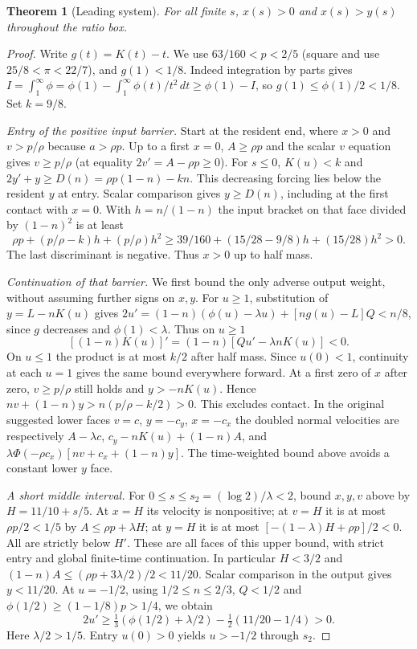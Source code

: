 \documentclass[11pt]{article}
\newtheorem{theorem}{Theorem}
\begin{document}
\begin{theorem}[Leading system]\label{an01pbv1:sign}
For all finite $s$, $x(s)>0$ and $x(s)>y(s)$ throughout the ratio box.
\end{theorem}
\begin{proof}
Write $g(t)=K(t)-t$. We use $63/160<p<2/5$ (square and use
$25/8<\pi<22/7$), and $g(1)<1/8$. Indeed integration by parts
gives $I=\int_1^\infty\phi=\phi(1)-\int_1^\infty\phi(t)/t^2\,dt
\ge\phi(1)-I$, so $g(1)\le\phi(1)/2<1/8$.
Set $k=9/8$.

\emph{Entry of the positive input barrier.} Start at the resident end,
where $x>0$ and $v>p/\rho$ because $a>\rho p$.
Up to a first $x=0$, $A\ge\rho p$ and the scalar $v$ equation gives
$v\ge p/\rho$ (at equality $2v'=A-\rho p\ge0$).
For $s\le0$, $K(u)<k$ and
$2y'+y\ge D(n)=\rho p(1-n)-kn$. This decreasing forcing lies below
the resident $y$ at entry. Scalar comparison gives $y\ge D(n)$,
including at the first contact with $x=0$.
With $h=n/(1-n)$ the input bracket on that face divided by $(1-n)^2$
is at least
\[
 \rho p+(p/\rho-k)h+(p/\rho)h^2
 \ge 39/160+(15/28-9/8)h+(15/28)h^2>0 .
\]
The last discriminant is negative. Thus $x>0$ up to half mass.

\emph{Continuation of that barrier.} We first bound the only adverse
output weight, without assuming further signs on $x,y$.
For $u\ge1$, substitution of $y=L-nK(u)$ gives
$2u'=(1-n)(\phi(u)-\lambda u)+[ng(u)-L]Q<n/8$,
since $g$ decreases and $\phi(1)<\lambda$. Thus on $u\ge1$
\[
 [(1-n)K(u)]'=(1-n)[Qu'-\lambda nK(u)]<0.
\]
On $u\le1$ the product is at most $k/2$ after half mass.
Since $u(0)<1$, continuity at each $u=1$ gives the same bound
everywhere forward. At a first zero of $x$ after zero,
$v\ge p/\rho$ still holds and $y>-nK(u)$. Hence
$nv+(1-n)y>n(p/\rho-k/2)>0$. This excludes contact.
In the original suggested lower faces $v=c$, $y=-c_y$, $x=-c_x$
the doubled normal velocities are respectively $A-\lambda c$,
$c_y-nK(u)+(1-n)A$, and
$\lambda\Phi(-\rho c_x)[nv+c_x+(1-n)y]$.
The time-weighted bound above avoids a constant lower $y$ face.

\emph{A short middle interval.} For $0\le s\le s_2=(\log2)/\lambda<2$,
bound $x,y,v$ above by $H=11/10+s/5$. At $x=H$ its velocity is
nonpositive; at $v=H$ it is at most $\rho p/2<1/5$ by
$A\le\rho p+\lambda H$; at $y=H$ it is at most
$[-(1-\lambda)H+\rho p]/2<0$. All are strictly below $H'$.
These are all faces of this upper bound, with strict entry and global
finite-time continuation. In particular $H<3/2$ and
$(1-n)A\le(\rho p+3\lambda/2)/2<11/20$.
Scalar comparison in the output gives $y<11/20$. At $u=-1/2$,
using $1/2\le n\le2/3$, $Q<1/2$ and
$\phi(1/2)\ge(1-1/8)p>1/4$, we obtain
\[
 2u'\ge\tfrac13(\phi(1/2)+\lambda/2)
       -\tfrac12(11/20-1/4)>0.
\]
Here $\lambda/2>1/5$. Entry $u(0)>0$ yields $u>-1/2$ through $s_2$.


\end{proof}
\end{document}
